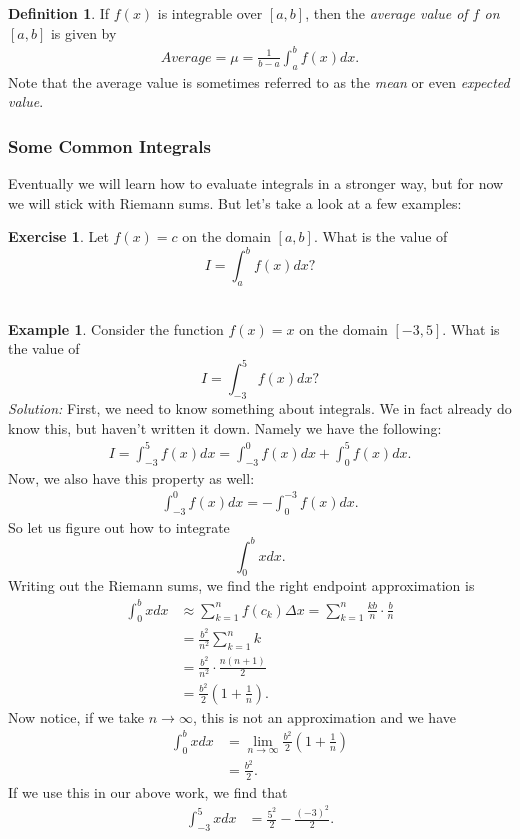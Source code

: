 \documentclass[leqno]{article}
\theoremstyle{definition}
\newtheorem{definition}{Definition}[section]
\newtheorem{example}{Example}[section]
\newtheorem{exercise}{Exercise}[section]
\theoremstyle{remark}
\theoremstyle{theorem}
\begin{document}
\begin{definition}
If $f(x)$ is integrable over $[a,b]$, then the \emph{average value of $f$ on $[a,b]$} is given by
\begin{align*}
Average=\mu=\frac{1}{b-a} \int_a^b f(x)dx.
\end{align*}
Note that the average value is sometimes referred to as the \emph{mean} or even \emph{expected value}.
\end{definition}

\subsubsection{Some Common Integrals}

Eventually we will learn how to evaluate integrals in a stronger way, but for now we will stick with Riemann sums. But let's take a look at a few examples:

\begin{exercise}
Let $f(x)=c$ on the domain $[a,b]$.  What is the value of
\[
I=\int_a^b f(x)dx?
\]
\vspace*{5cm}\\
\end{exercise}

\begin{example}
Consider the function $f(x)=x$ on the domain $[-3,5]$. What is the value of
\[
I=\int_{-3}^5 f(x)dx?
\]
\noindent\emph{Solution:} First, we need to know something about integrals.  We in fact already do know this, but haven't written it down.  Namely we have the following:
\begin{align*}
I=\int_{-3}^5 f(x) dx = \int_{-3}^0 f(x) dx + \int_0^5 f(x)dx.
\end{align*}
Now, we also have this property as well:
\begin{align*}
\int_{-3}^0 f(x)dx = -\int_0^{-3} f(x)dx.
\end{align*}
So let us figure out how to integrate 
\[
\int_0^b x dx.
\]
Writing out the Riemann sums, we find the right endpoint approximation is
\begin{align*}
\int_0^b x dx &\approx \sum_{k=1}^n f(c_k)\Delta x = \sum_{k=1}^n \frac{kb}{n}\cdot \frac{b}{n}\\
&= \frac{b^2}{n^2} \sum_{k=1}^n k\\
&= \frac{b^2}{n^2} \cdot \frac{n(n+1)}{2}\\
&= \frac{b^2}{2}\left( 1+ \frac{1}{n}\right).
\end{align*}
Now notice, if we take $n\to \infty$, this is not an approximation and we have
\begin{align*}
\int_0^b x dx &= \lim_{n\to \infty} \frac{b^2}{2}\left(1+\frac{1}{n}\right)\\
&= \frac{b^2}{2}.
\end{align*}
If we use this in our above work, we find that
\begin{align*}
\int_{-3}^5 x dx &= \frac{5^2}{2}-\frac{(-3)^2}{2}.
\end{align*}
\end{example}
\end{document}
